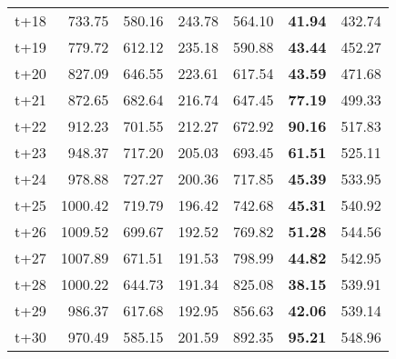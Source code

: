 \begin{table}[H]
\begin{tabular}{lrrrrrr}
t+18  & 733.75  & 580.16  & 243.78  & 564.10  & \textbf{41.94}  & 432.74  \\
t+19  & 779.72  & 612.12  & 235.18  & 590.88  & \textbf{43.44}  & 452.27  \\
t+20  & 827.09  & 646.55  & 223.61  & 617.54  & \textbf{43.59}  & 471.68  \\
t+21  & 872.65  & 682.64  & 216.74  & 647.45  & \textbf{77.19}  & 499.33  \\
t+22  & 912.23  & 701.55  & 212.27  & 672.92  & \textbf{90.16}  & 517.83  \\
t+23  & 948.37  & 717.20  & 205.03  & 693.45  & \textbf{61.51}  & 525.11  \\
t+24  & 978.88  & 727.27  & 200.36  & 717.85  & \textbf{45.39}  & 533.95  \\
t+25  & 1000.42  & 719.79  & 196.42  & 742.68  & \textbf{45.31}  & 540.92  \\
t+26  & 1009.52  & 699.67  & 192.52  & 769.82  & \textbf{51.28}  & 544.56  \\
t+27  & 1007.89  & 671.51  & 191.53  & 798.99  & \textbf{44.82}  & 542.95  \\
t+28  & 1000.22  & 644.73  & 191.34  & 825.08  & \textbf{38.15}  & 539.91  \\
t+29  & 986.37  & 617.68  & 192.95  & 856.63  & \textbf{42.06}  & 539.14  \\
t+30  & 970.49  & 585.15  & 201.59  & 892.35  & \textbf{95.21}  & 548.96  \\

\bottomrule
\end{tabular}
\end{table}
